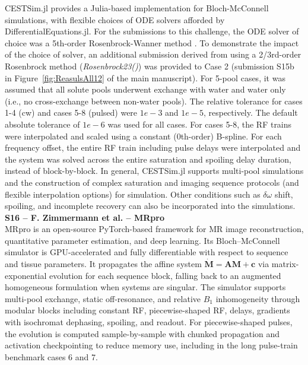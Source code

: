 \documentclass[11pt,a4paper]{article}
\begin{document}
CESTSim.jl provides a Julia-based implementation for Bloch-McConnell simulations, with flexible choices of ODE solvers afforded by DifferentialEquations.jl. For the submissions to this challenge, the ODE solver of choice was a 5th-order Rosenbrock-Wanner method \cite{Steinebach2023}. To demonstrate the impact of the choice of solver, an additional submission derived from using a 2/3rd-order Rosenbrock method (\textit{Rosenbrock23()}) was provided to Case 2 (submission S15b in Figure~\ref{fig:ReasulsAll12} of the main manuscript). For 5-pool cases, it was assumed that all solute pools underwent exchange with water and water only (i.e., no cross-exchange between non-water pools). The relative tolerance for cases 1-4 (cw) and cases 5-8 (pulsed) were $1e-3$ and $1e-5$, respectively. The default absolute tolerance of $1e-6$ was used for all cases. For cases 5-8, the RF trains were interpolated and scaled using a constant (0th-order) B-spline. For each frequency offset, the entire RF train including pulse delays were interpolated and the system was solved across the entire saturation and spoiling delay duration, instead of block-by-block. In general, CESTSim.jl supports multi-pool simulations and the construction of complex saturation and imaging sequence protocols (and flexible interpolation options) for simulation. Other conditions such as $\delta\omega$ shift, spoiling, and incomplete recovery can also be incorporated into the simulations.\\

\noindent\textbf{S16 -- F. Zimmermann et al. -- MRpro}\\
MRpro \cite{mrpro} is an open-source PyTorch-based framework for MR image reconstruction, quantitative parameter estimation, and deep learning. Its Bloch--McConnell simulator is GPU-accelerated and fully differentiable with respect to sequence and tissue parameters. It propagates the affine system $\dot{\mathbf{M}}=\mathbf{A}\mathbf{M}+\mathbf{c}$ via matrix-exponential evolution for each sequence block, falling back to an augmented homogeneous formulation when systems are singular. The simulator supports multi-pool exchange, static off-resonance, and relative $B_1$ inhomogeneity through modular blocks including constant RF, piecewise-shaped RF, delays, gradients with isochromat dephasing, spoiling, and readout. For piecewise-shaped pulses, the evolution is computed sample-by-sample with chunked propagation and activation checkpointing to reduce memory use, including in the long pulse-train benchmark cases 6 and 7.\\
\end{document}

